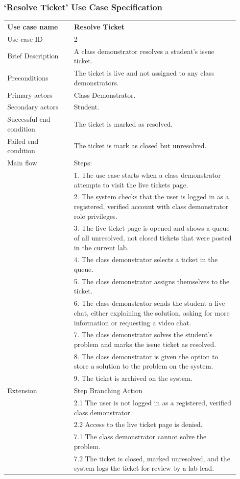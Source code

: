 \documentclass[a4paper,11pt]{article}
\begin{document}
\subsubsection*{`Resolve Ticket' Use Case Specification}
\begin{table}[H]
\centering
 \begin{tabular}{p{0.27\linewidth}  p{0.67\linewidth}}
 \textbf{Use case name} & \textbf{Resolve Ticket}  \\
 Use case ID & 2\\
 Brief Description & A class demonstrator resolves a student's issue ticket.\\
 Preconditions & The ticket is live and not assigned to any class demonstrators.\\
 Primary actors & Class Demonstrator. \\
 Secondary actors & Student. \\
 Successful end condition & The ticket is marked as resolved. \\
 Failed end condition & The ticket is mark as closed but unresolved. \\
 Main flow & Steps:\\
 & 1. The use case starts when a class demonstrator attempts to visit the live tickets page.\\
 & 2. The system checks that the user is logged in as a registered, verified account with class demonstrator role privileges. \\
 & 3. The live ticket page is opened and shows a queue of all unresolved, not closed tickets that were posted in the current lab. \\
 & 4. The class demonstrator selects a ticket in the queue.\\
 & 5. The class demonstrator assigns themselves to the ticket. \\
 & 6. The class demonstrator sends the student a live chat, either explaining the solution, asking for more information or requesting a video chat. \\
 & 7. The class demonstrator solves the student's problem and marks the issue ticket as resolved. \\
 & 8. The class demonstrator is given the option to store a solution to the problem on the system.\\
 & 9. The ticket is archived on the system.\\

 Extension & Step\hspace{0.3cm} Branching Action \\
 & 2.1 \hspace{0.5cm}The user is not logged in as a registered, verified class demonstrator. \\
 & 2.2 \hspace{0.5cm}Access to the live ticket page is denied. \\
 & 7.1 \hspace{0.5cm} The class demonstrator cannot solve the problem.\\
 & 7.2 \hspace{0.5cm} The ticket is closed, marked unresolved, and the system logs the ticket for review by a lab lead.\\
  

\end{tabular}
\end{table}
\end{document}

